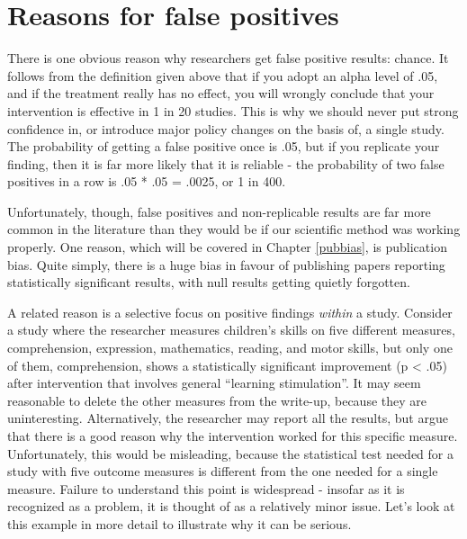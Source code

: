 \documentclass{krantz}
\begin{document}
\hypertarget{reasons-for-false-positives}{%
\section{Reasons for false positives}\label{reasons-for-false-positives}}

There is one obvious reason why researchers get false positive results: chance. It follows from the definition given above that if you adopt an alpha level of .05, and if the treatment really has no effect, you will wrongly conclude that your intervention is effective in 1 in 20 studies. This is why we should never put strong confidence in, or introduce major policy changes on the basis of, a single study. The probability of getting a false positive once is .05, but if you replicate your finding, then it is far more likely that it is reliable - the probability of two false positives in a row is .05 * .05 = .0025, or 1 in 400.

Unfortunately, though, false positives and non-replicable results are far more common in the literature than they would be if our scientific method was working properly. One reason, which will be covered in Chapter \ref{pubbias}, is publication bias. Quite simply, there is a huge bias in favour of publishing papers reporting statistically significant results, with null results getting quietly forgotten.

A related reason is a selective focus on positive findings \emph{within} a study. Consider a study where the researcher measures children's skills on five different measures, comprehension, expression, mathematics, reading, and motor skills, but only one of them, comprehension, shows a statistically significant improvement (p \textless{} .05) after intervention that involves general ``learning stimulation''. It may seem reasonable to delete the other measures from the write-up, because they are uninteresting. Alternatively, the researcher may report all the results, but argue that there is a good reason why the intervention worked for this specific measure. Unfortunately, this would be misleading, because the statistical test needed for a study with five outcome measures is different from the one needed for a single measure. Failure to understand this point is widespread - insofar as it is recognized as a problem, it is thought of as a relatively minor issue. Let's look at this example in more detail to illustrate why it can be serious.
\end{document}
